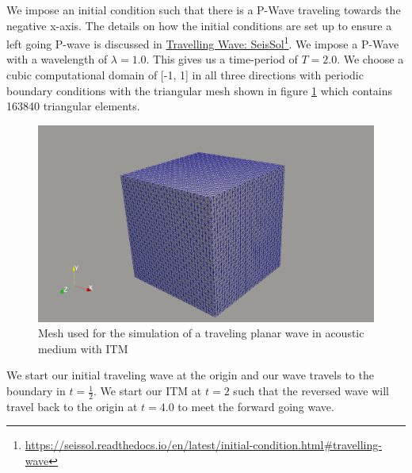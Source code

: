We impose an initial condition such that there is a P-Wave traveling towards the negative x-axis. The details on how the initial conditions are set up to ensure a left going P-wave is discussed in
\href{https://seissol.readthedocs.io/en/latest/initial-condition.html#travelling-wave}{Travelling Wave: SeisSol}\footnote{\href{https://seissol.readthedocs.io/en/latest/initial-condition.html\#travelling-wave}{https://seissol.readthedocs.io/en/latest/initial-condition.html\#travelling-wave}}. We impose a P-Wave with a wavelength of 
$\lambda = 1.0$. This gives us a time-period of $T=2.0$. We choose a cubic computational domain of [-1, 1] in all three directions with periodic boundary conditions with the triangular mesh shown in figure \ref{fig:acoustic_mesh} which contains
163840 triangular elements. 

\begin{figure}[htpb]
    \centering
    \includegraphics[width=0.85\linewidth]{figures/mesh_cube.png}
    \caption{Mesh used for the simulation of a traveling planar wave in acoustic medium with \ac{ITM}}
    \label{fig:acoustic_mesh}
\end{figure}
\par We start our initial traveling wave at the origin and our wave travels to the boundary in $t = \frac{1}{2}$. We start our \ac{ITM} at $t=2$ such that the reversed wave will travel back to the origin at $t=4.0$ to meet the
forward going wave. 

